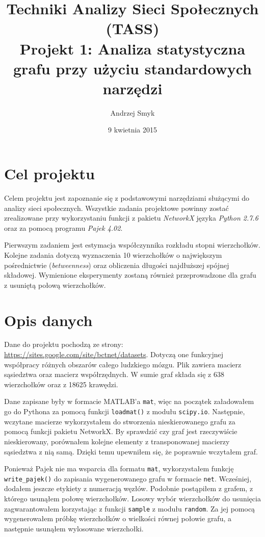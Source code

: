 \documentclass[a4paper,10pt]{article}
\title{Techniki Analizy Sieci Społecznych (TASS)\\Projekt 1: Analiza statystyczna grafu przy użyciu standardowych narzędzi}
\author{Andrzej Smyk}
\date{9 kwietnia 2015}
\begin{document}
	\maketitle
	
	\section{Cel projektu}
	Celem projektu jest zapoznanie się z podstawowymi narzędziami służącymi do analizy sieci społecznych. Wszystkie zadania projektowe powinny zostać zrealizowane przy wykorzystaniu funkcji z pakietu \textit{NetworkX} języka \textit{Python 2.7.6} oraz za pomocą programu \textit{Pajek 4.02}.

	Pierwszym zadaniem jest estymacja współczynnika rozkładu stopni wierzchołków. Kolejne zadania dotyczą wyznaczenia 10 wierzchołków o największym pośrednictwie (\textit{betweenness}) oraz obliczenia długości najdłuższej spójnej składowej. Wymienione eksperymenty zostaną również przeprowadzone dla grafu z usuniętą połową wierzchołków.

	\section{Opis danych}
	Dane do projektu pochodzą ze strony: \linebreak\url{https://sites.google.com/site/bctnet/datasets}. Dotyczą one funkcyjnej współpracy różnych obszarów całego ludzkiego mózgu. Plik zawiera macierz sąsiedztwa oraz macierz współrzędnych. W sumie graf składa się z 638 wierzchołków oraz z 18625 krawędzi. 

	Dane zapisane były w formacie MATLAB'a \texttt{mat}, więc na początek załadowałem go do Pythona za pomocą funkcji \texttt{loadmat()} z modułu \texttt{scipy.io}. Następnie, wczytane macierze wykorzystałem do stworzenia nieskierowanego grafu za pomocą funkcji pakietu NetworkX. By sprawdzić czy graf jest rzeczywiście nieskierowany, porównałem kolejne elementy z transponowanej macierzy sąsiedztwa z nią samą. Dzięki temu upewniłem się, że poprawnie wczytałem graf.

	Ponieważ Pajek nie ma wsparcia dla formatu \texttt{mat}, wykorzystałem funkcję \texttt{write\_pajek()} do zapisania wygenerowanego grafu w formacie \texttt{net}. Wcześniej, dodałem jeszcze etykiety z numeracją węzłów. Podobnie postąpiłem z grafem, z którego usunąłem połowę wierzchołków. Losowy wybór wierzchołków do usunięcia zagwarantowałem korzystając z funkcji \texttt{sample} z modułu \texttt{random}. Za jej pomocą wygenerowałem próbkę wierzchołków o wielkości równej połowie grafu, a następnie usunąłem wylosowane wierzchołki.
\end{document}
